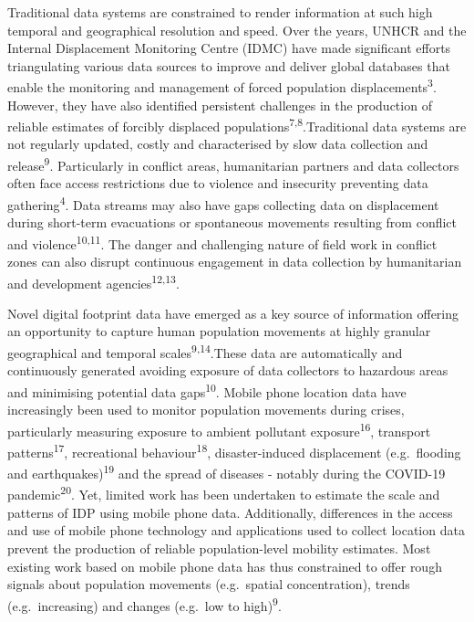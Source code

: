 \documentclass[
  11pt,
]{article}
\begin{document}
Traditional data systems are constrained to render information at such
high temporal and geographical resolution and speed. Over the years,
UNHCR and the Internal Displacement Monitoring Centre (IDMC) have made
significant efforts triangulating various data sources to improve and
deliver global databases that enable the monitoring and management of
forced population displacements\textsuperscript{3}. However, they have
also identified persistent challenges in the production of reliable
estimates of forcibly displaced
populations\textsuperscript{7,8}.Traditional data systems are not
regularly updated, costly and characterised by slow data collection and
release\textsuperscript{9}. Particularly in conflict areas, humanitarian
partners and data collectors often face access restrictions due to
violence and insecurity preventing data gathering\textsuperscript{4}.
Data streams may also have gaps collecting data on displacement during
short-term evacuations or spontaneous movements resulting from conflict
and violence\textsuperscript{10,11}. The danger and challenging nature
of field work in conflict zones can also disrupt continuous engagement
in data collection by humanitarian and development
agencies\textsuperscript{12,13}.

Novel digital footprint data have emerged as a key source of information
offering an opportunity to capture human population movements at highly
granular geographical and temporal scales\textsuperscript{9,14}.These
data are automatically and continuously generated avoiding exposure of
data collectors to hazardous areas and minimising potential data
gaps\textsuperscript{10}. Mobile phone location data have increasingly
been used to monitor population movements during crises, particularly
measuring exposure to ambient pollutant exposure\textsuperscript{16},
transport patterns\textsuperscript{17}, recreational
behaviour\textsuperscript{18}, disaster-induced displacement
(e.g.~flooding and earthquakes)\textsuperscript{19} and the spread of
diseases - notably during the COVID-19 pandemic\textsuperscript{20}.
Yet, limited work has been undertaken to estimate the scale and patterns
of IDP using mobile phone data. Additionally, differences in the access
and use of mobile phone technology and applications used to collect
location data prevent the production of reliable population-level
mobility estimates. Most existing work based on mobile phone data has
thus constrained to offer rough signals about population movements
(e.g.~spatial concentration), trends (e.g.~increasing) and changes
(e.g.~low to high)\textsuperscript{9}.
\end{document}
